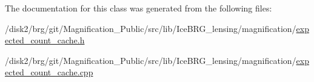 The documentation for this class was generated from the following files\-:\begin{DoxyCompactItemize}
\item 
/disk2/brg/git/\-Magnification\-\_\-\-Public/src/lib/\-Ice\-B\-R\-G\-\_\-lensing/magnification/\hyperlink{expected__count__cache_8h}{expected\-\_\-count\-\_\-cache.\-h}\item 
/disk2/brg/git/\-Magnification\-\_\-\-Public/src/lib/\-Ice\-B\-R\-G\-\_\-lensing/magnification/\hyperlink{expected__count__cache_8cpp}{expected\-\_\-count\-\_\-cache.\-cpp}\end{DoxyCompactItemize}
